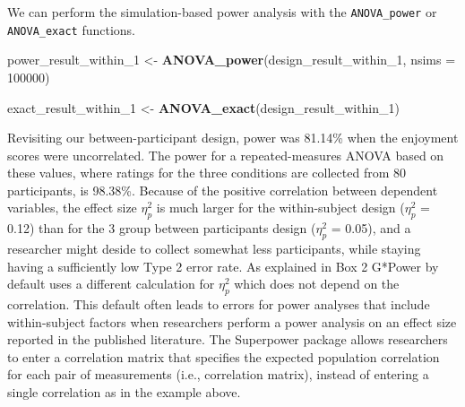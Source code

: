 \documentclass[,man,floatsintext]{apa6}
\newenvironment{Shaded}{\begin{snugshade}}{\end{snugshade}}
\newcommand{\DataTypeTok}[1]{\textcolor[rgb]{0.13,0.29,0.53}{#1}}
\newcommand{\DecValTok}[1]{\textcolor[rgb]{0.00,0.00,0.81}{#1}}
\newcommand{\KeywordTok}[1]{\textcolor[rgb]{0.13,0.29,0.53}{\textbf{#1}}}
\newcommand{\NormalTok}[1]{#1}
\newcommand{\StringTok}[1]{\textcolor[rgb]{0.31,0.60,0.02}{#1}}
\begin{document}
We can perform the simulation-based power analysis with the \texttt{ANOVA\_power} or \texttt{ANOVA\_exact} functions.

\begin{Shaded}
\begin{Highlighting}[]
\NormalTok{power_result_within_}\DecValTok{1}\NormalTok{ <-}\StringTok{ }\KeywordTok{ANOVA_power}\NormalTok{(design_result_within_}\DecValTok{1}\NormalTok{, }
                                     \DataTypeTok{nsims =} \DecValTok{100000}\NormalTok{)}

\NormalTok{exact_result_within_}\DecValTok{1}\NormalTok{ <-}\StringTok{ }\KeywordTok{ANOVA_exact}\NormalTok{(design_result_within_}\DecValTok{1}\NormalTok{)}
\end{Highlighting}
\end{Shaded}

Revisiting our between-participant design, power was 81.14\% when the enjoyment scores were uncorrelated.
The power for a repeated-measures ANOVA based on these values, where ratings for the three conditions are collected from 80 participants, is 98.38\%.
Because of the positive correlation between dependent variables, the effect size \(\eta_p^2\) is much larger for the within-subject design (\(\eta_p^2\) = 0.12) than for the 3 group between participants design (\(\eta_p^2\) = 0.05), and a researcher might deside to collect somewhat less participants, while staying having a sufficiently low Type 2 error rate.
As explained in Box 2 G*Power by default uses a different calculation for \(\eta_p^2\) which does not depend on the correlation.
This default often leads to errors for power analyses that include within-subject factors when researchers perform a power analysis on an effect size reported in the published literature.
The Superpower package allows researchers to enter a correlation matrix that specifies the expected population correlation for each pair of measurements (i.e., correlation matrix), instead of entering a single correlation as in the example above.
\end{document}
